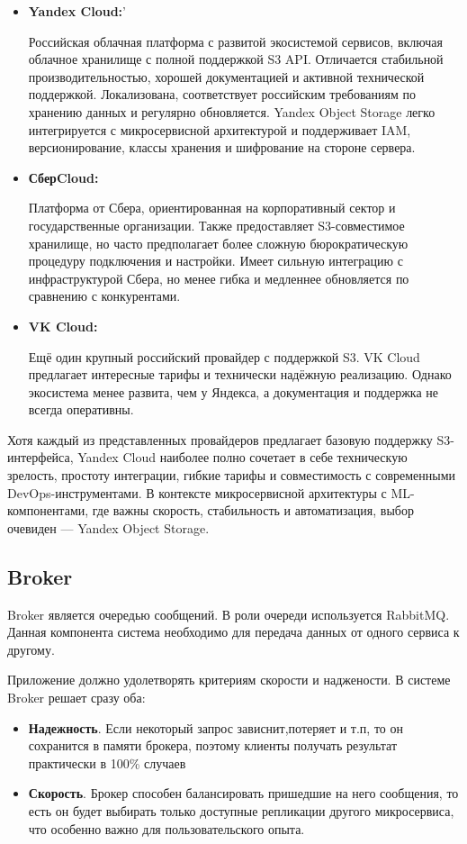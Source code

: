 \begin{itemize}
    \item \textbf{Yandex Cloud:}'
    
    Российская облачная платформа с развитой экосистемой сервисов, включая облачное хранилище с полной поддержкой S3 API. Отличается стабильной производительностью, хорошей документацией и активной технической поддержкой. Локализована, соответствует российским требованиям по хранению данных и регулярно обновляется. Yandex Object Storage легко интегрируется с микросервисной архитектурой и поддерживает IAM, версионирование, классы хранения и шифрование на стороне сервера.
    \item \textbf{СберCloud:}
    
    Платформа от Сбера, ориентированная на корпоративный сектор и государственные организации. Также предоставляет S3-совместимое хранилище, но часто предполагает более сложную бюрократическую процедуру подключения и настройки. Имеет сильную интеграцию с инфраструктурой Сбера, но менее гибка и медленнее обновляется по сравнению с конкурентами.
    \item \textbf{VK Cloud:}
    
    Ещё один крупный российский провайдер с поддержкой S3. VK Cloud предлагает интересные тарифы и технически надёжную реализацию. Однако экосистема менее развита, чем у Яндекса, а документация и поддержка не всегда оперативны.
   
  \end{itemize}

  Хотя каждый из представленных провайдеров предлагает базовую поддержку S3-интерфейса, Yandex Cloud наиболее полно сочетает в себе техническую зрелость, простоту интеграции, гибкие тарифы и совместимость с современными DevOps-инструментами. В контексте микросервисной архитектуры с ML-компонентами, где важны скорость, стабильность и автоматизация, выбор очевиден — Yandex Object Storage.

\subsection{Broker}

Broker является очередью сообщений. В роли очереди используется RabbitMQ.
Данная компонента система необходимо для передача данных от одного сервиса к другому. 

Приложение должно удолетворять критериям скорости и наджености. В системе Broker решает сразу оба:
\begin{itemize}
    \item \textbf{Надежность}. Если некоторый запрос зависнит,потеряет и т.п, то он сохранится в памяти брокера, поэтому  клиенты получать результат практически в 100\% случаев
     \item \textbf{Скорость}. Брокер способен балансировать пришедшие на него сообщения, то есть он будет выбирать только доступные репликации другого микросервиса, что особенно важно для пользовательского опыта.
\end{itemize}
